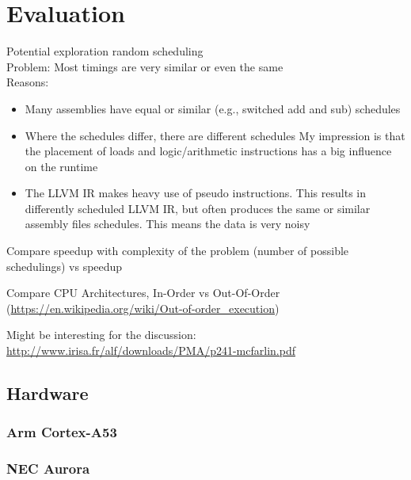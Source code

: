 \chapter{Evaluation}
Potential exploration \rightarrow random scheduling \\
Problem: Most timings are very similar or even the same \\
Reasons:
\begin{itemize}
    \item Many assemblies have equal or similar (e.g., switched add and sub) schedules
    \item Where the schedules differ, there are different schedules
    My impression is that the placement of loads and logic/arithmetic instructions has a big influence on the runtime
    \item The LLVM IR makes heavy use of pseudo instructions.
    This results in differently scheduled LLVM IR, but often produces the same or similar assembly files schedules.
    This means the data is very noisy
\end{itemize}

Compare speedup with complexity of the problem (number of possible schedulings) vs speedup

Compare CPU Architectures, In-Order vs Out-Of-Order (\url{https://en.wikipedia.org/wiki/Out-of-order_execution})

Might be interesting for the discussion: \url{http://www.irisa.fr/alf/downloads/PMA/p241-mcfarlin.pdf}

\section{Hardware}
\subsection{Arm Cortex-A53}
\subsection{NEC Aurora}
